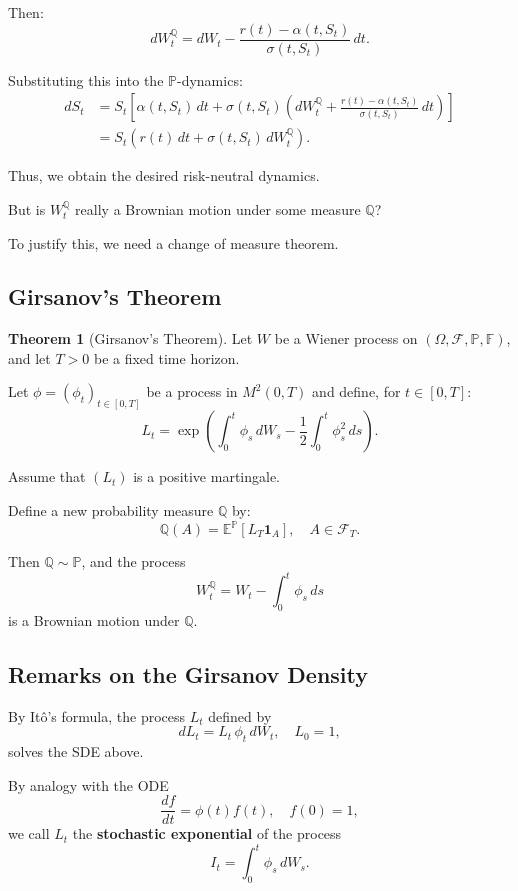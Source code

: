 \documentclass[12pt,a4paper]{article}
\theoremstyle{definition}
\newtheorem{theorem}{Theorem}[section]
\newcommand{\Q}{\mathbb{Q}}
\newcommand{\E}{\mathbb{E}}
\newcommand{\Prob}{\mathbb{P}}
\begin{document}
Then:
\[
dW_t^\Q = dW_t - \frac{r(t) - \alpha(t, S_t)}{\sigma(t, S_t)} \, dt.
\]

Substituting this into the $\Prob$-dynamics:
\begin{align}
dS_t &= S_t\left[\alpha(t, S_t) \, dt + \sigma(t, S_t)\left(dW_t^\Q + \frac{r(t) - \alpha(t, S_t)}{\sigma(t, S_t)} \, dt\right)\right] \\
&= S_t(r(t) \, dt + \sigma(t, S_t) \, dW_t^\Q).
\end{align}

Thus, we obtain the desired risk-neutral dynamics.

But is $W_t^\Q$ really a Brownian motion under some measure $\Q$?

To justify this, we need a change of measure theorem.

\subsection{Girsanov's Theorem}

\begin{theorem}[Girsanov's Theorem]
Let $W$ be a Wiener process on $(\Omega, \mathcal{F}, \Prob, \mathbb{F})$, and let $T > 0$ be a fixed time horizon.

Let $\phi = (\phi_t)_{t \in [0,T]}$ be a process in $M^2(0,T)$ and define, for $t \in [0,T]$:
\[
L_t = \exp\left(\int_0^t \phi_s \, dW_s - \frac{1}{2}\int_0^t \phi_s^2 \, ds\right).
\]

Assume that $(L_t)$ is a positive martingale.

Define a new probability measure $\Q$ by:
\[
\Q(A) = \E^\Prob[L_T \mathbf{1}_A], \quad A \in \mathcal{F}_T.
\]

Then $\Q \sim \Prob$, and the process
\[
W_t^\Q = W_t - \int_0^t \phi_s \, ds
\]
is a Brownian motion under $\Q$.
\end{theorem}

\subsection{Remarks on the Girsanov Density}

By Itô's formula, the process $L_t$ defined by
\[
dL_t = L_t \, \phi_t \, dW_t, \quad L_0 = 1,
\]
solves the SDE above.

By analogy with the ODE
\[
\frac{df}{dt} = \phi(t) f(t), \quad f(0) = 1,
\]
we call $L_t$ the \textbf{stochastic exponential} of the process
\[
I_t = \int_0^t \phi_s \, dW_s.
\]
\end{document}
